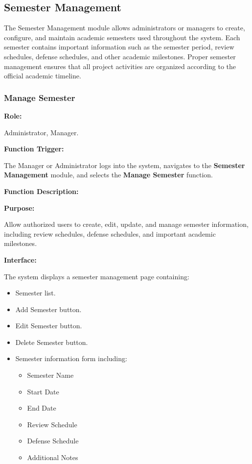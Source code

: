 

\subsection{Semester Management}

The Semester Management module allows administrators or managers to create, configure, and maintain academic semesters used throughout the system. Each semester contains important information such as the semester period, review schedules, defense schedules, and other academic milestones. Proper semester management ensures that all project activities are organized according to the official academic timeline.

\subsubsection{Manage Semester}

\textbf{Role:}

Administrator, Manager.

\vspace{0.3cm}

\textbf{Function Trigger:}

The Manager or Administrator logs into the system, navigates to the \textbf{Semester Management} module, and selects the \textbf{Manage Semester} function.

\vspace{0.3cm}

\textbf{Function Description:}

\textbf{Purpose:}

Allow authorized users to create, edit, update, and manage semester information, including review schedules, defense schedules, and important academic milestones.

\vspace{0.2cm}

\textbf{Interface:}

The system displays a semester management page containing:

\begin{itemize}
    \item Semester list.
    \item Add Semester button.
    \item Edit Semester button.
    \item Delete Semester button.
    \item Semester information form including:
    \begin{itemize}
        \item Semester Name
        \item Start Date
        \item End Date
        \item Review Schedule
        \item Defense Schedule
        \item Additional Notes
    \end{itemize}
\end{itemize}

